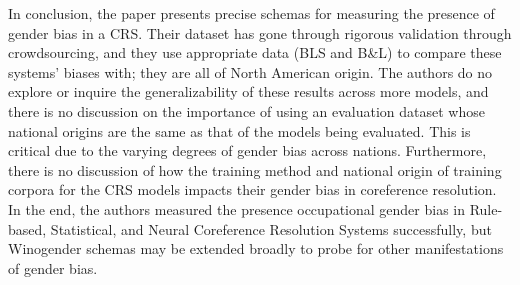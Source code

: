 \documentclass[11pt]{article}
\begin{document}
In conclusion, the paper presents precise schemas for measuring the presence of gender bias in a CRS. Their dataset
has gone through rigorous validation through crowdsourcing, and they use appropriate data (BLS and B\&L) 
to compare these systems' biases with; they are all of North American origin. The authors do no explore or inquire the generalizability of these results across more models, and there is no discussion 
on the importance of using an evaluation dataset whose national origins are the same as that of the models being evaluated. 
This is critical due to the varying degrees of gender bias across nations. Furthermore, there is no discussion of how the training method and national origin 
of training corpora for the CRS models impacts their gender bias in coreference resolution. In the end, the authors 
measured the presence occupational gender bias in Rule-based, Statistical, and Neural Coreference Resolution Systems successfully, but Winogender schemas
may be extended broadly to probe for other manifestations of gender bias.



\end{document}
